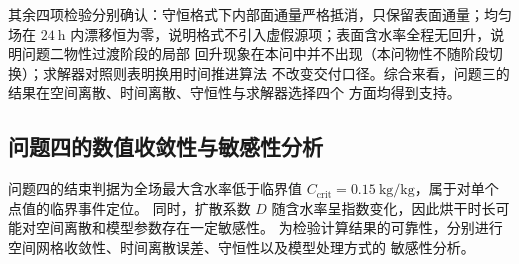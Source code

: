 \documentclass[12pt,a4paper]{ctexart}
\begin{document}
其余四项检验分别确认：守恒格式下内部面通量严格抵消，只保留表面通量；均匀场在 $24\ \mathrm{h}$
内漂移恒为零，说明格式不引入虚假源项；表面含水率全程无回升，说明问题二物性过渡阶段的局部
回升现象在本问中并不出现（本问物性不随阶段切换）；求解器对照则表明换用时间推进算法
不改变交付口径。综合来看，问题三的结果在空间离散、时间离散、守恒性与求解器选择四个
方面均得到支持。


\subsection{问题四的数值收敛性与敏感性分析} 问题四的结束判据为全场最大含水率低于临界值 $C_{\mathrm{crit}}=0.15\ \mathrm{kg/kg}$，属于对单个点值的临界事件定位。 同时，扩散系数 $D$ 随含水率呈指数变化，因此烘干时长可能对空间离散和模型参数存在一定敏感性。 为检验计算结果的可靠性，分别进行空间网格收敛性、时间离散误差、守恒性以及模型处理方式的 敏感性分析。
\end{document}
